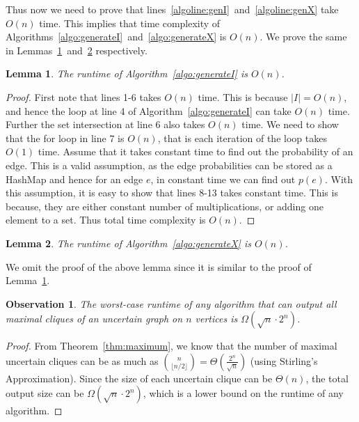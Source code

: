 \documentclass[11pt,letterpaper]{article}
\newtheorem{lemma}{Lemma}
\newtheorem{observation}{Observation}
\begin{document}
Thus now we need to prove that lines~\ref{algoline:genI}~and~\ref{algoline:genX}
take  $O \left ( n \right )$ time. This implies that time complexity of
Algorithms~\ref{algo:generateI}~and~\ref{algo:generateX} is $O \left ( n \right )$.
We prove the same in Lemmas~\ref{lemma:complexity1}~and~\ref{lemma:complexity2}
respectively.

\begin{lemma}
\label{lemma:complexity1}
The runtime of Algorithm~\ref{algo:generateI} is $O \left ( n \right )$.
\end{lemma}

\begin{proof}
First note that lines 1-6 takes $O \left ( n \right )$ time. 
This is because $\left | I \right | = O \left ( n \right )$,
and hence the loop at line 4 of Algorithm~\ref{algo:generateI}
can take $O \left ( n \right )$ time. Further the set intersection
at line 6 also takes $O \left ( n \right )$ time.
We need to show that the for loop in line 7 is $O \left ( n \right )$,
that is each iteration of the loop takes $O \left ( 1 \right )$ time. 
Assume that it takes constant time to find out the probability of an edge.
This is a valid assumption, as the edge probabilities can be stored as a
HashMap and hence for an edge $e$, in constant time we can find out $p(e)$.
With this assumption, it is easy to show that lines 8-13 takes constant time.
This is because, they are either constant number of multiplications, or adding 
one element to a set. Thus total time complexity is $O \left ( n \right )$. 
\end{proof}

\begin{lemma}
\label{lemma:complexity2}
The runtime of Algorithm~\ref{algo:generateX} is $O \left ( n \right )$.
\end{lemma}

We omit the proof of the above lemma since it is similar to the proof
of Lemma~\ref{lemma:complexity1}.

\begin{observation}
\label{obs:opt}
The worst-case runtime of any algorithm that can output all maximal cliques of an uncertain graph on $n$ vertices is $\Omega \left ( \sqrt{n} \cdot 2^n \right )$.
\end{observation}

\begin{proof}
From Theorem~\ref{thm:maximum}, we know that the number of maximal uncertain cliques
can be as much as ${n \choose \lfloor n/2 \rfloor} = \Theta \left (\frac{{2^n}}{\sqrt{n}} \right )$
(using Stirling's Approximation). Since the size of each uncertain
clique can be $\Theta\left ( n \right )$, the total output size can be
$\Omega \left ( \sqrt{n} \cdot 2^n \right )$, which is a lower bound
on the runtime of any algorithm. 
\end{proof}
\end{document}
